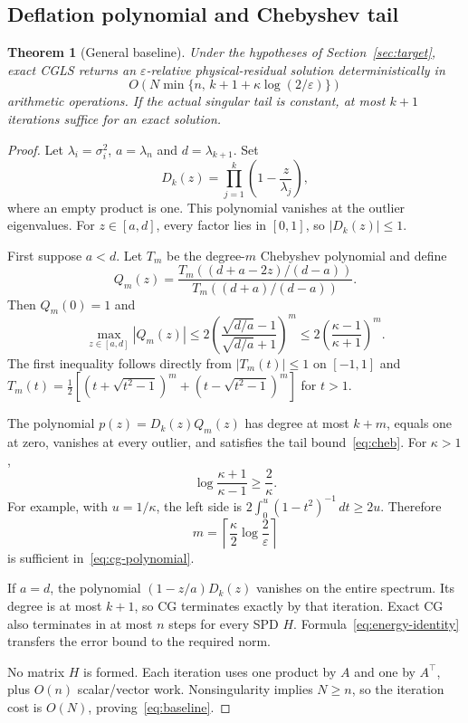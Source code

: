\documentclass[11pt,a4paper]{article}
\newcommand{\eps}{\varepsilon}
\newtheorem{theorem}{Theorem}[section]
\theoremstyle{definition}
\theoremstyle{remark}
\begin{document}
\subsection{Deflation polynomial and Chebyshev tail}
\begin{theorem}[General baseline]
\label{thm:baseline}
Under the hypotheses of Section~\ref{sec:target}, exact CGLS returns an $\eps$-relative physical-residual solution deterministically in
\begin{equation}
 O\!\left(N\min\{n,\,k+1+\kappa\log(2/\eps)\}\right)
 \label{eq:baseline}
\end{equation}
arithmetic operations. If the actual singular tail is constant, at most $k+1$ iterations suffice for an exact solution.
\end{theorem}
\begin{proof}
Let $\lambda_i=\sigma_i^2$, $a=\lambda_n$ and $d=\lambda_{k+1}$. Set
\[
 D_k(z)=\prod_{j=1}^k\left(1-\frac z{\lambda_j}\right),
\]
where an empty product is one. This polynomial vanishes at the outlier eigenvalues. For $z\in[a,d]$, every factor lies in $[0,1]$, so $|D_k(z)|\le1$.

First suppose $a<d$. Let $T_m$ be the degree-$m$ Chebyshev polynomial and define
\[
 Q_m(z)=
 \frac{T_m((d+a-2z)/(d-a))}{T_m((d+a)/(d-a))}.
\]
Then $Q_m(0)=1$ and
\begin{equation}
 \max_{z\in[a,d]}|Q_m(z)|
 \le 2\left(\frac{\sqrt{d/a}-1}{\sqrt{d/a}+1}\right)^m
 \le 2\left(\frac{\kappa-1}{\kappa+1}\right)^m.
 \label{eq:cheb}
\end{equation}
The first inequality follows directly from $|T_m(t)|\le1$ on $[-1,1]$ and
$T_m(t)=\tfrac12[(t+\sqrt{t^2-1})^m+(t-\sqrt{t^2-1})^m]$ for $t>1$.

The polynomial $p(z)=D_k(z)Q_m(z)$ has degree at most $k+m$, equals one at zero, vanishes at every outlier, and satisfies the tail bound~\eqref{eq:cheb}. For $\kappa>1$,
\[
 \log\frac{\kappa+1}{\kappa-1}\ge\frac2\kappa.
\]
For example, with $u=1/\kappa$, the left side is
$2\int_0^u(1-t^2)^{-1}\,dt\ge2u$. Therefore
\[
 m=\left\lceil\frac\kappa2\log\frac2\eps\right\rceil
\]
is sufficient in~\eqref{eq:cg-polynomial}.

If $a=d$, the polynomial $(1-z/a)D_k(z)$ vanishes on the entire spectrum. Its degree is at most $k+1$, so CG terminates exactly by that iteration. Exact CG also terminates in at most $n$ steps for every SPD $H$. Formula~\eqref{eq:energy-identity} transfers the error bound to the required norm.

No matrix $H$ is formed. Each iteration uses one product by $A$ and one by $A^\top$, plus $O(n)$ scalar/vector work. Nonsingularity implies $N\ge n$, so the iteration cost is $O(N)$, proving~\eqref{eq:baseline}.
\end{proof}
\end{document}
